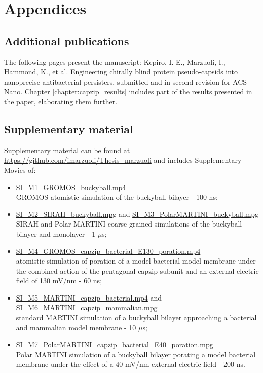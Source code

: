 
\setcounter{chapter}{-1}
\chapter{Appendices} \label{appendix}
\renewcommand{\thechapter}{A}


\section{Additional publications} \label{app:paper}
The following pages present the manuscript:
Kepiro, I. E., Marzuoli, I., Hammond, K., et al. Engineering chirally blind protein pseudo-capsids into nanoprecise antibacterial persisters, submitted and in second revision for ACS Nano. Chapter \ref{chapter:capzip_results} includes part of the results presented in the paper, elaborating them further.





\section{Supplementary material}
\label{sec:SI}
Supplementary material can be found at \url{https://github.com/imarzuoli/Thesis_marzuoli} and includes Supplementary Movies of:
\begin{itemize}
\item \url{SI_M1_GROMOS_buckyball.mp4} \\ GROMOS atomistic simulation of the buckyball bilayer - 100 ns;

\item \url{SI_M2_SIRAH_buckyball.mpg} and \url{SI_M3_PolarMARTINI_buckyball.mpg} \\ SIRAH and Polar MARTINI coarse-grained simulations of the buckyball bilayer and monolayer - 1 $\mu$s;

\item \url{SI_M4_GROMOS_capzip_bacterial_E130_poration.mp4} \\ atomistic simulation of poration of a model bacterial model membrane under the combined action of the pentagonal capzip subunit and an external electric field of 130 mV/nm - 60 ns;

\item \url{SI_M5_MARTINI_capzip_bacterial.mp4} and \url{SI_M6_MARTINI_capzip_mammalian.mpg} \\ standard MARTINI simulation of a buckyball bilayer approaching a bacterial and mammalian model membrane - 10 $\mu$s;

\item \url{SI_M7_PolarMARTINI_capzip_bacterial_E40_poration.mpg} \\ Polar MARTINI simulation of a buckyball bilayer porating a model bacterial membrane under the effect of a 40 mV/nm external electric field - 200 ns.
\end{itemize}


